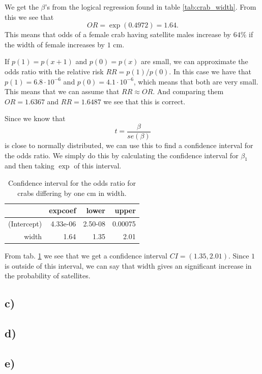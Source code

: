 \documentclass[a4paper,norsk, 10pt]{article}
\begin{document}
We get the $\beta$'s from the logical regression found in table \ref{tab:crab_width}. From this we see that 
\begin{equation}
OR = \exp(0.4972) = 1.64.
\end{equation}
This means that odds of a female crab having satellite males increase by $64\%$ if the width of female increases by $1$ cm.

If $p(1) = p(x+1)$ and $p(0)=p(x)$ are small, we can approximate the odds ratio with the relative risk $RR = p(1)/p(0)$. In this case we have that $p(1) = 6.8\cdot 10^{-6}$ and $p(0) = 4.1 \cdot 10^{-6}$, which means that both are very small. This means that we can assume that $RR \approx OR$. And comparing them $OR = 1.6367$ and $RR = 1.6487$ we see that this is correct.

Since we know that 
\begin{equation}
t = \frac{\beta}{se(\beta)}
\end{equation}
is close to normally distributed, we can use this to find a confidence interval for the odds ratio. We simply do this by calculating the confidence interval for $\beta_1$ and then taking $\exp$ of this interval. 

\begin{table}[!ht]
\centering
\begin{tabular}{rrrr}
  \hline
 & expcoef & lower & upper \\ 
  \hline
(Intercept) & 4.33e-06 & 2.50-08 & 0.00075 \\ 
  width & 1.64 & 1.35 & 2.01 \\ 
   \hline
\end{tabular}
\caption{Confidence interval for the odds ratio for crabs differing by one cm in width.}\label{tab:crabs_OR_CI}
\end{table}

From tab. \ref{tab:crabs_OR_CI} we see that we get a confidence interval $CI = (1.35,2.01)$. Since $1$ is outside of this interval, we can say that width gives an significant increase in the probability of satellites. 

\subsection{c)}

\subsection{d)}
\subsection{e)}
\end{document}
